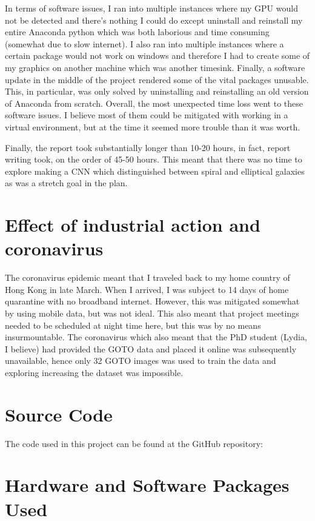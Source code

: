 \documentclass[a4paper,fleqn,usenatbib]{mnras}
\begin{document}
In terms of software issues, I ran into multiple instances where my GPU would not be detected and there's nothing I could do except uninstall and reinstall my entire Anaconda python which was both laborious and time consuming (somewhat due to slow internet). I also ran into multiple instances where a certain package would not work on windows and therefore I had to create some of my graphics on another machine which was another timesink. Finally, a software update in the middle of the project rendered some of the vital packages unusable. This, in particular, was only solved by uninstalling and reinstalling an old version of Anaconda from scratch. Overall, the most unexpected time loss went to these software issues. I believe most of them could be mitigated with working in a virtual environment, but at the time it seemed more trouble than it was worth. 

Finally, the report took substantially longer than 10-20 hours, in fact, report writing took, on the order of 45-50 hours. This meant that there was no time to explore making a CNN which distinguished between spiral and elliptical galaxies as was a stretch goal in the plan.
\section{Effect of industrial action and coronavirus}
\label{2020 special}
The coronavirus epidemic meant that I traveled back to my home country of Hong Kong in late March. When I arrived, I was subject to 14 days of home quarantine with no broadband internet. However, this was mitigated somewhat by using mobile data, but was not ideal. This also meant that project meetings needed to be scheduled at night time here, but this was by no means insurmountable. The coronavirus which also meant that the PhD student (Lydia, I believe) had provided the GOTO data and placed it online was subsequently unavailable, hence only 32 GOTO images was used to train the data and exploring increasing the dataset was impossible. 


\section{Source Code}
\label{Code}
The code used in this project can be found at the GitHub repository: 

\section{Hardware and Software Packages Used}
\label{HSWare}
\end{document}
